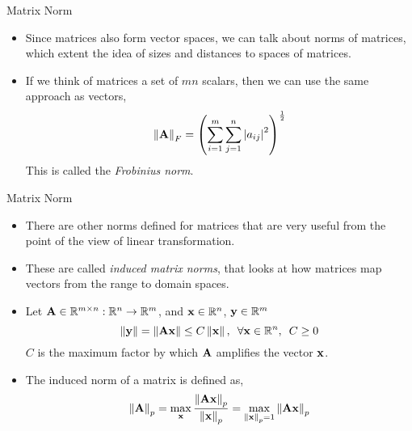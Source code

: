 \documentclass[aspectratio=169]{beamer}
\let\olditem\item
\renewcommand{\item}{\setlength{\itemsep}{\fill}\olditem}
\def\mf{\ensuremath\mathbf}
\def\mb{\ensuremath\mathbb}
\def\lp{\ensuremath\left(}
\def\rp{\ensuremath\right)}
\def\lv{\ensuremath\left\lvert}
\def\rv{\ensuremath\right\rvert}
\def\lV{\ensuremath\left\lVert}
\def\rV{\ensuremath\right\rVert}
\begin{document}
\begin{frame}[t]{Matrix Norm}
\begin{itemize}
    \item Since matrices also form vector spaces, we can talk about norms of matrices, which extent the idea of sizes and distances to spaces of matrices.

    \item If we think of matrices a set of $mn$ scalars, then we can use the same approach as vectors,
    \[ \lV \mf{A} \rV_F = \lp \sum_{i=1}^{m}\sum_{j=1}^{n}\lv a_{ij} \rv^2 \rp^\frac{1}{2} \]
    This is called the \textit{Frobinius norm}.    
\end{itemize}
\end{frame}


\begin{frame}[t]{Matrix Norm}
\begin{itemize}
    \item There are other norms defined for matrices that are very useful from the point of the view of linear transformation.

    \item These are called \textit{induced matrix norms}, that looks at how matrices map vectors from the range to domain spaces.

    \item Let $\mf{A} \in \mb{R}^{m \times n}: \mb{R}^n \to \mb{R}^m$, and $\mf{x} \in \mb{R}^n$, $\mf{y} \in \mb{R}^m$
    \[ \lV \mf{y} \rV = \lV \mf{A}\mf{x} \rV \leq C\lV\mf{x}\rV, \,\,\, \forall \mf{x} \in \mb{R}^n, \,\,\, C \geq 0 \]
    $C$ is the maximum factor by which $\mf{A}$ amplifies the vector $\mf{x}$.
    \item The induced norm of a matrix is defined as,
    \[  \lV \mf{A} \rV_p = \max_{\mf{x}} \frac{\lV \mf{A}\mf{x}\rV_p}{\lV \mf{x}\rV_p} = \max_{\lV\mf{x}\rV_p = 1} {\lV \mf{A}\mf{x}\rV_p} \]
\end{itemize}
\end{frame}
\end{document}
